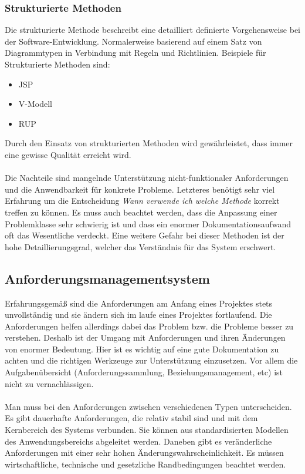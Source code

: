 \subsubsection{Strukturierte Methoden}
Die strukturierte Methode beschreibt eine detailliert definierte Vorgehensweise bei der Software-Entwicklung. Normalerweise basierend auf einem Satz von Diagrammtypen in Verbindung mit Regeln und Richtlinien. Beispiele für Strukturierte Methoden sind:
\begin{itemize}
\item JSP
\item V-Modell
\item RUP
\end{itemize}

Durch den Einsatz von strukturierten Methoden wird gewährleistet, dass immer eine gewisse Qualität erreicht wird. 
\\\\
Die Nachteile sind mangelnde Unterstützung nicht-funktionaler Anforderungen und die Anwendbarkeit für konkrete Probleme. Letzteres benötigt sehr viel Erfahrung um die Entscheidung \textit{Wann verwende ich welche Methode} korrekt treffen zu können. Es muss auch beachtet werden, dass die Anpassung einer Problemklasse sehr schwierig ist und dass ein enormer Dokumentationsaufwand oft das Wesentliche verdeckt. Eine weitere Gefahr bei dieser Methoden ist der hohe  Detaillierungsgrad, welcher das Verständnis für das System erschwert.

\subsection{Anforderungsmanagementsystem}
Erfahrungsgemäß sind die Anforderungen am Anfang eines Projektes stets unvollständig und sie ändern sich im laufe eines Projektes fortlaufend. Die Anforderungen helfen allerdings dabei das Problem bzw. die Probleme besser zu verstehen. Deshalb ist der Umgang mit Anforderungen und ihren Änderungen von enormer Bedeutung.  Hier ist es wichtig auf eine gute Dokumentation zu achten und die richtigen Werkzeuge zur Unterstützung einzusetzen. Vor allem die Aufgabenübersicht (Anforderungssammlung, Beziehungsmanagement, etc) ist nicht zu vernachlässigen.
\\\\
Man muss bei den Anforderungen zwischen verschiedenen Typen unterscheiden. Es gibt dauerhafte Anforderungen, die relativ stabil sind und mit dem Kernbereich des Systems verbunden. Sie können aus standardisierten Modellen des Anwendungsbereichs abgeleitet werden. Daneben gibt es veränderliche Anforderungen mit einer sehr hohen Änderungswahrscheinlichkeit. Es müssen wirtschaftliche, technische und gesetzliche Randbedingungen beachtet werden. 